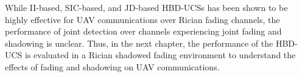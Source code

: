 
While II-based, SIC-based, and JD-based HBD-UCSs has been shown to be highly effective for UAV communications over Rician fading channels, the performance of joint detection over channels experiencing joint fading and shadowing is unclear. Thus, in the next chapter, the performance of the HBD-UCS is evaluated in a Rician shadowed fading environment to understand the effects of fading and shadowing on UAV communications.


